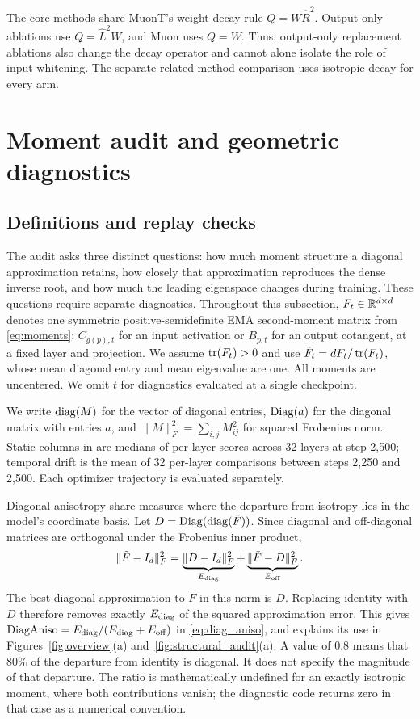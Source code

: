 The core methods share MuonT's weight-decay rule $Q=W\hat R^2$. Output-only ablations use $Q=\hat L^2W$, and Muon uses $Q=W$. Thus, output-only replacement ablations also change the decay operator and cannot alone isolate the role of input whitening. The separate related-method comparison uses isotropic decay for every arm.

\section{Moment audit and geometric diagnostics}
\label{app:appendix_mech}

\subsection{Definitions and replay checks}
\label{app:diagnostic_definitions}

The audit asks three distinct questions: how much moment structure a diagonal approximation retains, how closely that approximation reproduces the dense inverse root, and how much the leading eigenspace changes during training. These questions require separate diagnostics. Throughout this subsection, $F_t\in\mathbb{R}^{d\times d}$ denotes one symmetric positive-semidefinite EMA second-moment matrix from \cref{eq:moments}: $C_{g(p),t}$ for an input activation or $B_{p,t}$ for an output cotangent, at a fixed layer and projection. We assume $\operatorname{tr}(F_t)>0$ and use $\tilde F_t=dF_t/\operatorname{tr}(F_t)$, whose mean diagonal entry and mean eigenvalue are one. All moments are uncentered. We omit $t$ for diagnostics evaluated at a single checkpoint.

We write $\operatorname{diag}(M)$ for the vector of diagonal entries, $\operatorname{Diag}(a)$ for the diagonal matrix with entries $a$, and $\|M\|_F^2=\sum_{i,j}M_{ij}^2$ for squared Frobenius norm. Static columns in  are medians of per-layer scores across 32 layers at step 2,500; temporal drift is the mean of 32 per-layer comparisons between steps 2,250 and 2,500. Each optimizer trajectory is evaluated separately.

Diagonal anisotropy share measures where the departure from isotropy lies in the model's coordinate basis. Let $D=\operatorname{Diag}(\operatorname{diag}(\tilde F))$. Since diagonal and off-diagonal matrices are orthogonal under the Frobenius inner product,
\[
 \|\tilde F-I_d\|_F^2
 =\underbrace{\|D-I_d\|_F^2}_{E_{\rm diag}}
 +\underbrace{\|\tilde F-D\|_F^2}_{E_{\rm off}}.
\]
The best diagonal approximation to $\tilde F$ in this norm is $D$. Replacing identity with $D$ therefore removes exactly $E_{\rm diag}$ of the squared approximation error. This gives $\mathrm{DiagAniso}=E_{\rm diag}/(E_{\rm diag}+E_{\rm off})$ in \cref{eq:diag_aniso}, and explains its use in Figures~\ref{fig:overview}(a) and~\ref{fig:structural_audit}(a). A value of 0.8 means that 80\% of the departure from identity is diagonal. It does not specify the magnitude of that departure. The ratio is mathematically undefined for an exactly isotropic moment, where both contributions vanish; the diagnostic code returns zero in that case as a numerical convention.

